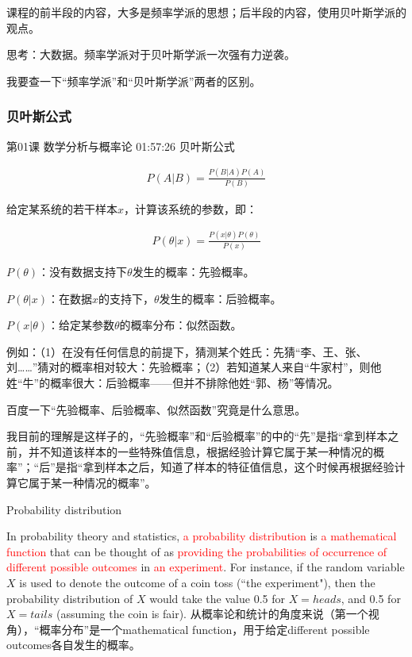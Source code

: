 \documentclass[UTF8]{ctexbook}
\begin{document}
课程的前半段的内容，大多是频率学派的思想；后半段的内容，使用贝叶斯学派的观点。

思考：大数据。频率学派对于贝叶斯学派一次强有力逆袭。

我要查一下“频率学派”和“贝叶斯学派”两者的区别。

\subsubsection{贝叶斯公式}

第01课 数学分析与概率论 01:57:26 贝叶斯公式

\begin{equation}
\begin{aligned}
P(A|B)=\frac{P(B|A)P(A)}{P(B)}
\end{aligned}
\end{equation}

给定某系统的若干样本$x$，计算该系统的参数，即：

\begin{equation}
\begin{aligned}
P(\theta|x)=\frac{P(x|\theta)P(\theta)}{P(x)}
\end{aligned}
\end{equation}

$P(\theta)$：没有数据支持下$\theta$发生的概率：先验概率。

$P(\theta|x)$：在数据$x$的支持下，$\theta$发生的概率：后验概率。

$P(x|\theta)$：给定某参数$\theta$的概率分布：似然函数。

例如：（1）在没有任何信息的前提下，猜测某个姓氏：先猜“李、王、张、刘……”猜对的概率相对较大：先验概率；（2）若知道某人来自“牛家村”，则他姓“牛”的概率很大：后验概率——但并不排除他姓“郭、杨”等情况。

百度一下“先验概率、后验概率、似然函数”究竟是什么意思。

我目前的理解是这样子的，“先验概率”和“后验概率”的中的“先”是指“拿到样本之前，并不知道该样本的一些特殊值信息，根据经验计算它属于某一种情况的概率”；“后”是指“拿到样本之后，知道了样本的特征值信息，这个时候再根据经验计算它属于某一种情况的概率”。

Probability distribution


In probability theory and statistics, \textcolor{red}{a probability distribution} is \textcolor{red}{a mathematical function} that can be thought of as \textcolor{red}{providing the probabilities of occurrence of different possible outcomes} in \textcolor{red}{an experiment}. For instance, if the random variable $X$ is used to denote the outcome of a coin toss (``the experiment"), then the probability distribution of $X$ would take the value 0.5 for $X = heads$, and 0.5 for $X = tails$ (assuming the coin is fair). 从概率论和统计的角度来说（第一个视角），“概率分布”是一个mathematical function，用于给定different possible outcomes各自发生的概率。
\end{document}
